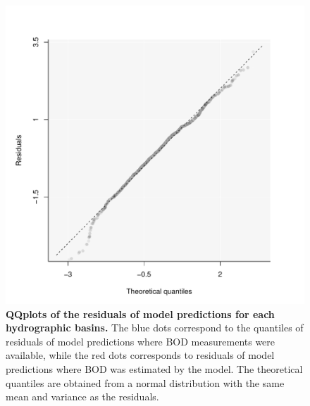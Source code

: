 \documentclass[11pt, oneside]{article}
\begin{document}
\begin{figure}[H]
\begin{center}
\includegraphics[page=1, width=1\linewidth]{b0_6_3/out_con/fig_qqplot_residuals.pdf}
\caption{
    \textbf{QQplots of the residuals of model predictions for each hydrographic basins.}
    The blue dots correspond to the quantiles of residuals of model predictions where BOD measurements were available, while the red dots corresponds to residuals of model predictions where BOD was estimated by the model.
    The theoretical quantiles are obtained from a normal distribution with the same mean and variance as the residuals.
} 
\end{center}
\end{figure}
\end{document}
